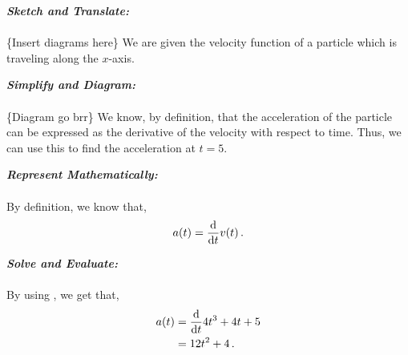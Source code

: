 %
%
%


\begin{subquestions}
	
\subquestion

\begin{subsubquestions}
	
\subsubquestion

\textbf{\textit{Sketch and Translate:}} \\ \\
\{Insert diagrams here\}
We are given the velocity function of a particle which is traveling along the $x$-axis.




\textbf{\textit{Simplify and Diagram:}} \\ \\
\{Diagram go brr\}
We know, by definition, that the acceleration of the particle can be expressed as the derivative of the velocity with respect to time. Thus, we can use this to find the acceleration at $t=5$.




\textbf{\textit{Represent Mathematically:}} \\ \\
By definition, we know that,
\begin{equation}
	a(t) = \frac{\mathrm{d}}{\mathrm{d}t} v(t) \label{2005:q5:AEqn1} \,.
\end{equation}




\textbf{\textit{Solve and Evaluate:}} \\ \\
By using , we get that,
\begin{align}
	a(t) & = \frac{\mathrm{d}}{\mathrm{d}t} 4t^3 +4t +5 \nonumber \\
	     & = 12t^2 + 4 \,.
\end{align}


\end{subsubquestions}
\end{subquestions}
